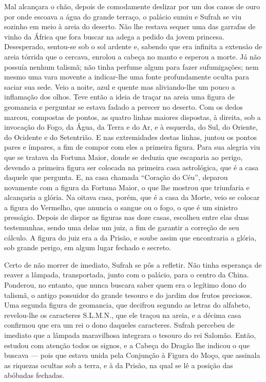 Mal alcançara o chão, depois de comodamente deslizar por um dos canos de
ouro por onde escoava a água do grande terraço, o palácio sumiu e Sufrah
se viu sozinho em meio à areia do deserto. Não lhe restava sequer uma das
garrafas de vinho da África que fora buscar na adega a pedido da jovem
princesa. Desesperado, sentou-se sob o sol ardente e, sabendo que era
infinita a extensão de areia tórrida que o cercava, enrolou a cabeça no
manto e esperou a morte. Já não possuía nenhum talismã; não tinha perfume
algum para fazer sufumigações; nem mesmo uma vara movente a indicar-lhe
uma fonte profundamente oculta para saciar sua sede. Veio a noite, azul e
quente mas aliviando-lhe um pouco a inflamação dos olhos. Teve então a
ideia de traçar na areia uma figura de geomancia e perguntar se estava
fadado a perecer no deserto. Com os dedos marcou, compostas de pontos, as
quatro linhas maiores dispostas, à direita, sob a invocação do Fogo, da
Água, da Terra e do Ar, e à esquerda, do Sul, do Oriente, do Ocidente e do
Setentrião. E nas extremidades destas linhas, juntou os pontos pares e
ímpares, a fim de compor com eles a primeira figura. Para sua alegria viu
que se tratava da Fortuna Maior, donde se deduzia que escaparia ao perigo,
devendo a primeira figura ser colocada na primeira casa astrológica, que é
a casa daquele que pergunta. E, na casa chamada “Coração do Céu”, deparou
novamente com a figura da Fortuna Maior, o que lhe mostrou que triunfaria
e alcançaria a glória. Na oitava casa, porém, que é a casa da Morte, veio
se colocar a figura do Vermelho, que anuncia o sangue ou o fogo, o que é
um sinistro presságio. Depois de dispor as figuras nas doze casas,
escolheu entre elas duas testemunhas, sendo uma delas um juiz, a fim de
garantir a correção de seu cálculo. A figura do juiz era a da Prisão, e
soube assim que encontraria a glória, sob grande perigo, em algum lugar
fechado e secreto.

Certo de não morrer de imediato, Sufrah se pôs a refletir. Não tinha
esperança de reaver a lâmpada, transportada, junto com o palácio, para o
centro da China. Ponderou, no entanto, que nunca buscara saber quem era o
legítimo dono do talismã, o antigo possuidor do grande tesouro e do jardim
dos frutos preciosos. Uma segunda figura de geomancia, que decifrou
segundo as letras do alfabeto, revelou-lhe os caracteres S.L.M.N., que ele
traçou na areia, e a décima casa confirmou que era um rei o dono daqueles
caracteres. Sufrah percebeu de imediato que a lâmpada maravilhosa
integrara o tesouro do rei Salomão. Então, estudou com atenção todos os
signos, e a Cabeça do Dragão lhe indicou o que buscava --- pois que estava
unida pela Conjunção à Figura do Moço, que assinala as riquezas ocultas
sob a terra, e à da Prisão, na qual se lê a posição das abóbadas fechadas.

